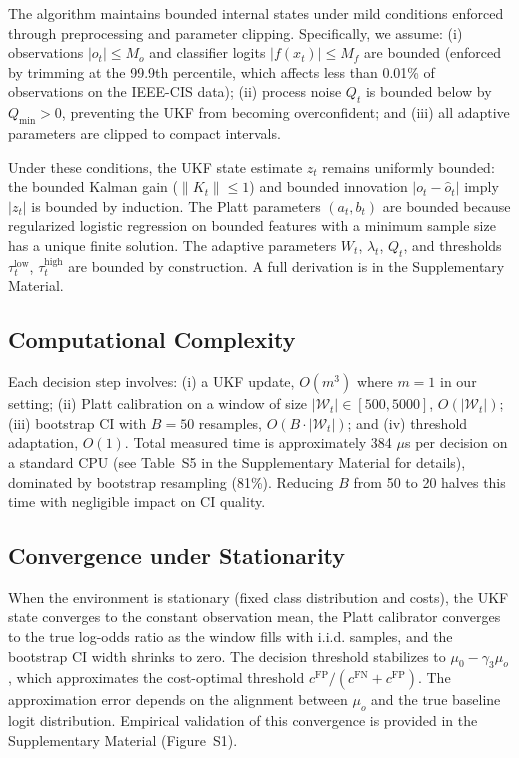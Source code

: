 \documentclass[12pt,a4paper]{article}
\begin{document}
The algorithm maintains bounded internal states under mild conditions enforced through preprocessing and parameter clipping. Specifically, we assume: (i) observations $|o_t| \leq M_o$ and classifier logits $|f(x_t)| \leq M_f$ are bounded (enforced by trimming at the 99.9th percentile, which affects less than 0.01\% of observations on the IEEE-CIS data); (ii) process noise $Q_t$ is bounded below by $Q_{\min} > 0$, preventing the UKF from becoming overconfident; and (iii) all adaptive parameters are clipped to compact intervals.

Under these conditions, the UKF state estimate $z_t$ remains uniformly bounded: the bounded Kalman gain ($\|K_t\| \leq 1$) and bounded innovation $|o_t - \hat{o}_t|$ imply $|z_t|$ is bounded by induction. The Platt parameters $(a_t, b_t)$ are bounded because regularized logistic regression on bounded features with a minimum sample size has a unique finite solution. The adaptive parameters $W_t$, $\lambda_t$, $Q_t$, and thresholds $\tau_t^{\text{low}}$, $\tau_t^{\text{high}}$ are bounded by construction. A full derivation is in the Supplementary Material.

\subsection{Computational Complexity}

Each decision step involves: (i) a UKF update, $O(m^3)$ where $m=1$ in our setting; (ii) Platt calibration on a window of size $|\mathcal{W}_t| \in [500, 5000]$, $O(|\mathcal{W}_t|)$; (iii) bootstrap CI with $B=50$ resamples, $O(B \cdot |\mathcal{W}_t|)$; and (iv) threshold adaptation, $O(1)$. Total measured time is approximately 384 $\mu$s per decision on a standard CPU (see Table~S5 in the Supplementary Material for details), dominated by bootstrap resampling (81\%). Reducing $B$ from 50 to 20 halves this time with negligible impact on CI quality.

\subsection{Convergence under Stationarity}

When the environment is stationary (fixed class distribution and costs), the UKF state converges to the constant observation mean, the Platt calibrator converges to the true log-odds ratio as the window fills with i.i.d. samples, and the bootstrap CI width shrinks to zero. The decision threshold stabilizes to $\mu_0 - \gamma_3 \mu_o$, which approximates the cost-optimal threshold $c^{\text{FP}}/(c^{\text{FN}} + c^{\text{FP}})$. The approximation error depends on the alignment between $\mu_o$ and the true baseline logit distribution. Empirical validation of this convergence is provided in the Supplementary Material (Figure~S1).
\end{document}
